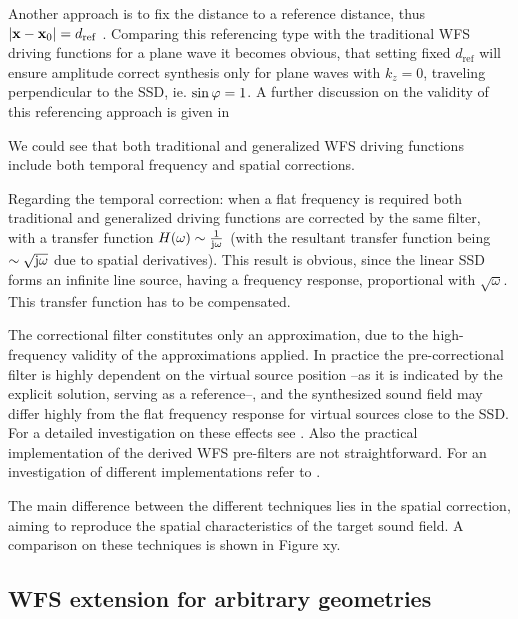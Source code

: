 Another approach is to fix the distance to a reference distance, thus $|\mathbf{x} - \mathbf{x}_0| = d_{\mathrm{ref}}$ \cite{Ahrens2012, Ahrens2010phd}. Comparing this referencing type with the traditional WFS driving functions for a plane wave it becomes obvious, that setting fixed $d_{\mathrm{ref}}$ will ensure amplitude correct synthesis only for plane waves with $k_z = 0$, traveling perpendicular to the SSD, ie. $\sin\varphi = 1$. A further discussion on the validity of this referencing approach is given in \cite[Sect.~3.9.4]{Ahrens2012}

\vspace{3mm}
We could see that both traditional and generalized WFS driving functions include both temporal frequency and spatial corrections.

Regarding the temporal correction: when a flat frequency is required both traditional and generalized driving functions are corrected by the same filter, with a transfer function $H(\omega) \sim \frac{1}{\mathrm{j} \omega}$ (with the resultant transfer function being $\sim \sqrt{\mathrm{j} \omega}$ due to spatial derivatives). This result is obvious, since the linear SSD forms an infinite line source, having a frequency response, proportional with $\sqrt{\omega}$. This transfer function has to be compensated. 

The correctional filter constitutes only an approximation, due to the high-frequency validity of the approximations applied. In practice the pre-correctional filter is highly dependent on the virtual source position --as it is indicated by the explicit solution, serving as a reference--, and the synthesized sound field may differ highly from the flat frequency response for virtual sources close to the SSD. For a detailed investigation on these effects see \cite{Spors10ahrens:analysis}. Also the practical implementation of the derived WFS pre-filters are not straightforward. For an investigation of different implementations refer to \cite{Schultz2013:IIR_prefilters}. 

\vspace{3mm}
The main difference between the different techniques lies in the spatial correction, aiming to reproduce the spatial characteristics of the target sound field. A comparison on these techniques is shown in Figure xy.

\subsection{WFS extension for arbitrary geometries}